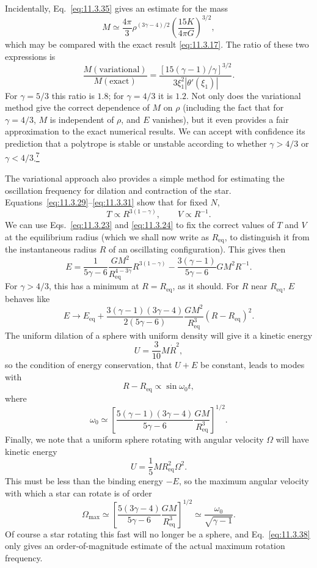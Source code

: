 Incidentally, Eq.~\eqref{eq:11.3.35} gives an estimate for the mass
\[
  M\simeq
  \frac{4\pi}{3}\rho^{(3\gamma-4)/2}
  \left(\frac{15K}{4\pi G}\right)^{3/2},
\]
which may be compared with the exact result \eqref{eq:11.3.17}. The ratio of
these two expressions is
\[
  \frac{M(\mathrm{variational})}{M(\mathrm{exact})}
  =
  \frac{[15(\gamma-1)/\gamma]^{3/2}}
  {3\xi_1^2|\theta'(\xi_1)|}.
\]
For \(\gamma=5/3\) this ratio is \(1.8\); for \(\gamma=4/3\) it is \(1.2\).
Not only does the variational method give the correct dependence of \(M\) on
\(\rho\) (including the fact that for \(\gamma=4/3\), \(M\) is independent
of \(\rho\), and \(E\) vanishes), but it even provides a fair approximation
to the exact numerical results. We can accept with confidence its prediction
that a polytrope is stable or unstable according to whether \(\gamma>4/3\) or
\(\gamma<4/3\).\hyperref[ch11-ref-7]{\textsuperscript{7}}

The variational approach also provides a simple method for estimating the
oscillation frequency for dilation and contraction of the star.
Equations~\eqref{eq:11.3.29}--\eqref{eq:11.3.31} show that for fixed \(N\),
\[
  T\propto R^{3(1-\gamma)},\qquad V\propto R^{-1}.
\]
We can use Eqs.~\eqref{eq:11.3.23} and \eqref{eq:11.3.24} to fix the correct
values of \(T\) and \(V\) at the equilibrium radius (which we shall now write
as \(R_{\mathrm{eq}}\), to distinguish it from the instantaneous radius \(R\)
of an oscillating configuration). This gives then
\[
  E
  =
  \frac1{5\gamma-6}
  \frac{GM^2}{R_{\mathrm{eq}}^{4-3\gamma}}
  R^{3(1-\gamma)}
  -\frac{3(\gamma-1)}{5\gamma-6}GM^2R^{-1}.
\]
For \(\gamma>4/3\), this has a minimum at \(R=R_{\mathrm{eq}}\), as it
should. For \(R\) near \(R_{\mathrm{eq}}\), \(E\) behaves like
\[
  E\longrightarrow
  E_{\mathrm{eq}}
  +\frac{3(\gamma-1)(3\gamma-4)}{2(5\gamma-6)}
  \frac{GM^2}{R_{\mathrm{eq}}^3}
  (R-R_{\mathrm{eq}})^2.
\]
The uniform dilation of a sphere with uniform density will give it a kinetic
energy
\[
  U=\frac3{10}M\dot R^2,
\]
so the condition of energy conservation, that \(U+E\) be constant, leads to
modes with
\[
  R-R_{\mathrm{eq}}\propto\sin\omega_0t,
\]
where
\begin{equation}
  \omega_0
  \simeq
  \left[
    \frac{5(\gamma-1)(3\gamma-4)}{5\gamma-6}
    \frac{GM}{R_{\mathrm{eq}}^3}
  \right]^{1/2}.
  \tag{11.3.37}\label{eq:11.3.37}
\end{equation}
Finally, we note that a uniform sphere rotating with angular velocity
\(\Omega\) will have kinetic energy
\[
  U=\frac15MR_{\mathrm{eq}}^2\Omega^2.
\]
This must be less than the binding energy \(-E\), so the maximum angular
velocity with which a star can rotate is of order
\begin{equation}
  \Omega_{\max}
  \simeq
  \left[
    \frac{5(3\gamma-4)}{5\gamma-6}
    \frac{GM}{R_{\mathrm{eq}}^3}
  \right]^{1/2}
  \simeq\frac{\omega_0}{\sqrt{\gamma-1}}.
  \tag{11.3.38}\label{eq:11.3.38}
\end{equation}
Of course a star rotating this fast will no longer be a sphere, and
Eq.~\eqref{eq:11.3.38} only gives an order-of-magnitude estimate of the actual
maximum rotation frequency.

